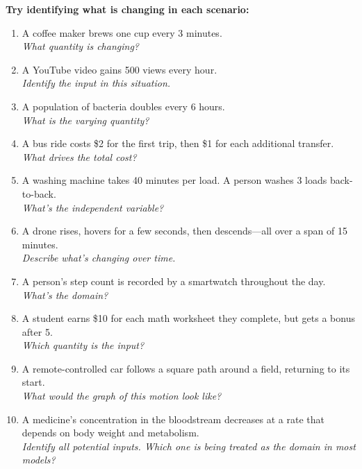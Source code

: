 \documentclass[11pt,landscape]{article}
\begin{document}
\begin{minipage}[t]{0.48\textwidth}
\raggedright
\Large\textbf{Try identifying what is changing in each scenario:} \\
\normalsize
\vspace{0.5em}

\begin{enumerate}
  \item A coffee maker brews one cup every 3 minutes. \\ 
  \small\textit{What quantity is changing?} \normalsize

  \item A YouTube video gains 500 views every hour. \\ 
  \small\textit{Identify the input in this situation.} \normalsize

  \item A population of bacteria doubles every 6 hours. \\ 
  \small\textit{What is the varying quantity?} \normalsize

  \item A bus ride costs \$2 for the first trip, then \$1 for each additional transfer. \\ 
  \small\textit{What drives the total cost?} \normalsize

  \item A washing machine takes 40 minutes per load. A person washes 3 loads back-to-back. \\ 
  \small\textit{What’s the independent variable?} \normalsize

  \item A drone rises, hovers for a few seconds, then descends—all over a span of 15 minutes. \\ 
  \small\textit{Describe what’s changing over time.} \normalsize

  \item A person’s step count is recorded by a smartwatch throughout the day. \\ 
  \small\textit{What’s the domain?} \normalsize

  \item A student earns \$10 for each math worksheet they complete, but gets a bonus after 5. \\ 
  \small\textit{Which quantity is the input?} \normalsize

  \item A remote-controlled car follows a square path around a field, returning to its start. \\ 
  \small\textit{What would the graph of this motion look like?} \normalsize

  \item A medicine’s concentration in the bloodstream decreases at a rate that depends on body weight and metabolism. \\ 
  \small\textit{Identify all potential inputs. Which one is being treated as the domain in most models?} \normalsize
\end{enumerate}
\end{minipage}
\end{document}
